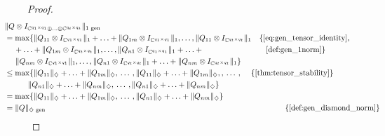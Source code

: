   \begin{proof}
    \begin{align*}
      & \hspace{-30pt} \lVert Q \otimes I_{\mathbb{C}^{q_1 \times q_1} \oplus \ldots \oplus \mathbb{C}^{q_t \times q_t}} \rVert_{1 \text{ gen}} \\
      & \hspace{-30pt}  = \max \{ \lVert Q_{11}  \otimes I_{\mathbb{C}^{q_1 \times q_1}}  \rVert_{1}  + \ldots +  \lVert Q_{1m}  \otimes I_{\mathbb{C}^{q_1 \times q_1}} \rVert_{1},  \ldots ,  \lVert Q_{11} \otimes I_{\mathbb{C}^{q_t \times q_t}} \rVert_{1}   \quad \{\text{\autoref{eq:gen_tensor_identity}, } \\
      & \hspace{-18pt}  + \ldots + \lVert Q_{1m} \otimes I_{\mathbb{C}^{q_t \times q_t}} \rVert_{1}, \ldots,  \lVert Q_{n1}  \otimes I_{\mathbb{C}^{q_1 \times q_1}}  \rVert_{1} + \ldots +  \hspace{80 pt} \text{\autoref{def:gen_1norm}} \} \\
      & \hspace{-16pt}\lVert Q_{nm}  \otimes I_{\mathbb{C}^{q_1 \times q_1}} \rVert_{1}, \ldots,  \lVert Q_{n1} \otimes I_{\mathbb{C}^{q_t \times q_t}} \rVert_{1} + \ldots + \lVert Q_{nm} \otimes I_{\mathbb{C}^{q_t \times q_t}} \rVert_{1} \} \\
      &  \hspace{-30pt}  \leq   \max \{ \|Q_{11}\|_{\diamondsuit} + \ldots + \|Q_{1m}\|_{\diamondsuit}, \hspace{2pt} \ldots \hspace{2pt},  \|Q_{11}\|_{\diamondsuit} + \ldots + \|Q_{1m}\|_{\diamondsuit}, , \hspace{2pt} \ldots \hspace{2pt},   \hspace{12 pt}  \{ \text{\autoref{thm:tensor_stability}}\}\\
      & \|Q_{n1}\|_{\diamondsuit} + \ldots + \|Q_{nm}\|_{\diamondsuit}, \hspace{2pt} \ldots \hspace{2pt}, \|Q_{n1}\|_{\diamondsuit} + \ldots + \|Q_{nm}\|_{\diamondsuit} \} \\
      &  \hspace{-30pt} = \max \{\|Q_{11}\|_{\diamondsuit} + \ldots + \|Q_{1m}\|_{\diamondsuit}, \hspace{2pt} \ldots \hspace{2pt}, \|Q_{n1}\|_{\diamondsuit} + \ldots + \|Q_{nm}\|_{\diamondsuit} \} \\
      & \hspace{-30pt}  = \lVert Q \rVert_{\diamondsuit \text{ gen}}  \hspace{308 pt}  \{ \text{\autoref{def:gen_diamond_norm}}\}
    \end{align*} 
  

\end{proof}
